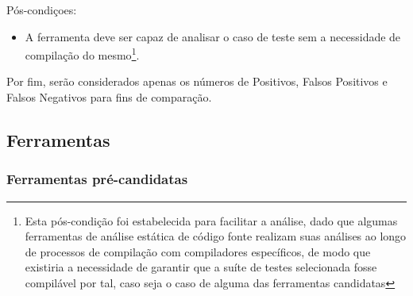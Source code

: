 Pós-condiçoes:
\begin{itemize}
  \item A ferramenta deve ser capaz de analisar o caso de teste sem a necessidade de compilação do mesmo\footnote{Esta pós-condição foi estabelecida para facilitar a análise, dado que algumas ferramentas de análise estática de código fonte realizam suas análises ao longo de processos de compilação com compiladores específicos, de modo que existiria a necessidade de garantir que a suíte de testes selecionada fosse compilável por tal, caso seja o caso de alguma das ferramentas candidatas}.
\end{itemize}

Por fim, serão considerados apenas os números de Positivos, Falsos Positivos e Falsos Negativos para fins de comparação.

\subsection{Ferramentas}

\subsubsection{Ferramentas pré-candidatas}

